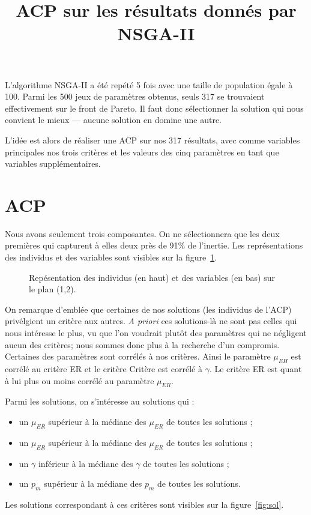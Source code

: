 \documentclass[a4paper, 11pt]{article}
\title{ACP sur les résultats donnés par NSGA-II}
\author{}
\date{}
\begin{document}
\maketitle   

L'algorithme NSGA-II a été repété 5 fois avec une taille de population égale à 100. Parmi les 500 jeux de paramètres obtenus, seuls 317 se trouvaient effectivement sur le front de Pareto.
Il faut donc sélectionner la solution qui nous convient le mieux --- aucune solution en domine une autre.

L'idée est alors de réaliser une ACP sur nos 317 résultats, avec comme variables principales nos trois critères et les valeurs des cinq paramètres en tant que variables supplémentaires.

\section{ACP}

Nous avons seulement trois composantes. On ne sélectionnera que les deux premières qui capturent à elles deux près de 91\% de l'inertie. Les représentations des individus et des variables sont visibles sur la figure~\ref{fig:pca}.

\begin{figure}[ht]
 \centering
 
 
 \caption{Repésentation des individus (en haut) et des variables (en bas) sur le plan (1,2).}
 
 \label{fig:pca}
\end{figure}

On remarque d'emblée que certaines de nos solutions (les individus de l'ACP) privélgient un critère aux autres. \textit{A priori} ces solutions-là ne sont pas celles qui nous intéresse le plus, vu que l'on voudrait plutôt des paramètres qui ne négligent aucun des critères; nous sommes donc plus à la recherche d'un compromis. Certaines des paramètres sont corrélés à nos critères. Ainsi le paramètre $\mu_{EH}$ est corrélé au critère ER et le critère Critère est corrélé à $\gamma$. Le critère ER est quant à lui plus ou moins corrélé au paramètre $\mu_{ER}$.


Parmi les solutions, on s'intéresse au solutions qui :
\begin{itemize}
 \item un $\mu_{ER}$ supérieur à la médiane des $\mu_{ER}$ de toutes les solutions ;
 \item un $\mu_{ER}$ supérieur à la médiane des $\mu_{ER}$ de toutes les solutions ;
 \item un $\gamma$ inférieur à la médiane des $\gamma$ de toutes les solutions ;
 \item un $p_m$ supérieur à la médiane des $p_m$ de toutes les solutions.
\end{itemize}
Les solutions correspondant à ces critères sont visibles sur la figure~\ref{fig:sol}.
\end{document}

